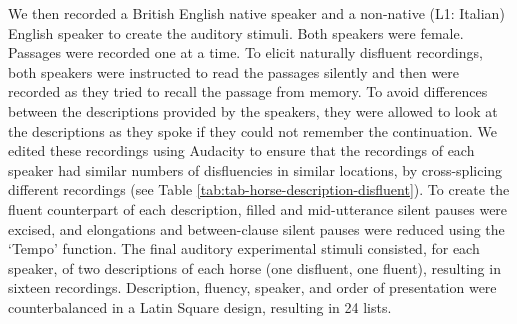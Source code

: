 \documentclass[
  man,floatsintext]{apa6}
\begin{document}
We then recorded a British English native speaker and a non-native (L1: Italian) English speaker to create the auditory stimuli. Both speakers were female. Passages were recorded one at a time. To elicit naturally disfluent recordings, both speakers were instructed to read the passages silently and then were recorded as they tried to recall the passage from memory. To avoid differences between the descriptions provided by the speakers, they were allowed to look at the descriptions as they spoke if they could not remember the continuation. We edited these recordings using Audacity to ensure that the recordings of each speaker had similar numbers of disfluencies in similar locations, by cross-splicing different recordings (see Table \ref{tab:tab-horse-description-disfluent}). To create the fluent counterpart of each description, filled and mid-utterance silent pauses were excised, and elongations and between-clause silent pauses were reduced using the `Tempo' function. The final auditory experimental stimuli consisted, for each speaker, of two descriptions of each horse (one disfluent, one fluent), resulting in sixteen recordings. Description, fluency, speaker, and order of presentation were counterbalanced in a Latin Square design, resulting in 24 lists.
\end{document}
